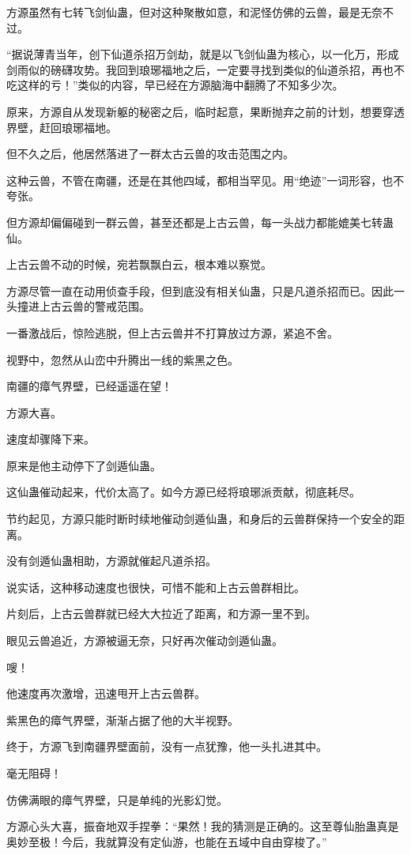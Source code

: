 \begin{this_body}
方源虽然有七转飞剑仙蛊，但对这种聚散如意，和泥怪仿佛的云兽，最是无奈不过。

“据说薄青当年，创下仙道杀招万剑劫，就是以飞剑仙蛊为核心，以一化万，形成剑雨似的磅礴攻势。我回到琅琊福地之后，一定要寻找到类似的仙道杀招，再也不吃这样的亏！”类似的内容，早已经在方源脑海中翻腾了不知多少次。

原来，方源自从发现新躯的秘密之后，临时起意，果断抛弃之前的计划，想要穿透界壁，赶回琅琊福地。

但不久之后，他居然落进了一群太古云兽的攻击范围之内。

这种云兽，不管在南疆，还是在其他四域，都相当罕见。用“绝迹”一词形容，也不夸张。

但方源却偏偏碰到一群云兽，甚至还都是上古云兽，每一头战力都能媲美七转蛊仙。

上古云兽不动的时候，宛若飘飘白云，根本难以察觉。

方源尽管一直在动用侦查手段，但到底没有相关仙蛊，只是凡道杀招而已。因此一头撞进上古云兽的警戒范围。

一番激战后，惊险逃脱，但上古云兽并不打算放过方源，紧追不舍。

视野中，忽然从山峦中升腾出一线的紫黑之色。

南疆的瘴气界壁，已经遥遥在望！

方源大喜。

速度却骤降下来。

原来是他主动停下了剑遁仙蛊。

这仙蛊催动起来，代价太高了。如今方源已经将琅琊派贡献，彻底耗尽。

节约起见，方源只能时断时续地催动剑遁仙蛊，和身后的云兽群保持一个安全的距离。

没有剑遁仙蛊相助，方源就催起凡道杀招。

说实话，这种移动速度也很快，可惜不能和上古云兽群相比。

片刻后，上古云兽群就已经大大拉近了距离，和方源一里不到。

眼见云兽追近，方源被逼无奈，只好再次催动剑遁仙蛊。

嗖！

他速度再次激增，迅速甩开上古云兽群。

紫黑色的瘴气界壁，渐渐占据了他的大半视野。

终于，方源飞到南疆界壁面前，没有一点犹豫，他一头扎进其中。

毫无阻碍！

仿佛满眼的瘴气界壁，只是单纯的光影幻觉。

方源心头大喜，振奋地双手捏拳：“果然！我的猜测是正确的。这至尊仙胎蛊真是奥妙至极！今后，我就算没有定仙游，也能在五域中自由穿梭了。”


\end{this_body}
